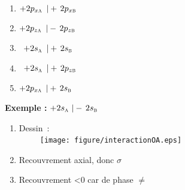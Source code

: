 \vspace{0.3cm}

\begin{minipage}[c]{0.5\linewidth}
\begin{enumerate}[\bf 1)]
\item $+2p_{x\textsc{a}}\ \, |+\,2p_{x\textsc{b}}$ 
\item $+2p_{z\textsc{a}}\ \, |-\,2p_{z\textsc{b}}$ 
\item $\ \, +2s_\textsc{a}\ \, |+\,2s_\textsc{b}$ 
\item $\ \, +2s_\textsc{a}\ \, |+\,2p_{z\textsc{b}}$ 
\item $+2p_{x\textsc{a}}\ \, |+\,2s_\textsc{b}$ 
\end{enumerate} 
\end{minipage} \hfill
\begin{minipage}[c]{0.5\linewidth}
 \textbf{Exemple :}  $+2s_\textsc{a}\ |-\,2s_\textsc{b}$
\begin{enumerate}[~~(i)] 
\item    Dessin~:\\[-0.3cm] 

   \  \  \  \  \   \texttt{[image: figure/interactionOA.eps]}
\item       Recouvrement axial, donc $\sigma$
\item       Recouvrement <0 car de phase $\neq $
\end{enumerate} 
\end{minipage}

